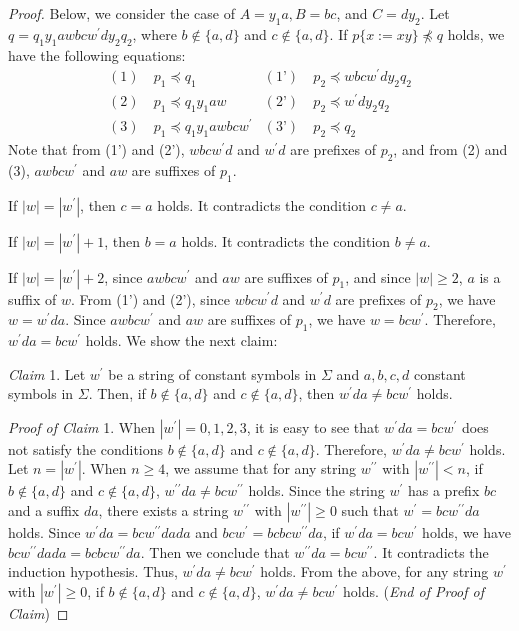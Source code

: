 \begin{proof}
  Below, we consider the case of $A=y_{1}a,B=bc$, and $C=dy_{2}$.
  Let $q=q_{1}y_{1}awbcw^{\prime}dy_{2}q_{2}$, where $b \not\in \{a,d\}$ and $c \not\in \{a,d\}$.
  If $p \{ x := xy \} \not \preceq q$ holds, we have the following equations:
  \begin{align*}
  (1)~& p_{1} \preceq q_{1} & (\text{1'})~& p_{2} \preceq wbcw^{\prime}dy_{2}q_{2} \\
  (2)~& p_{1} \preceq q_{1}y_{1}aw & (\text{2'})~& p_{2} \preceq w^{\prime}dy_{2}q_{2} \\
  (3)~& p_{1} \preceq q_{1}y_{1}awbcw^{\prime} & (\text{3'})~& p_{2} \preceq q_{2}
  \end{align*}
  Note that from (1') and (2'), $wbcw^{\prime}d$ and $w^{\prime}d$ are prefixes of $p_{2}$, and from (2) and (3), $awbcw^{\prime}$ and $aw$ are suffixes of $p_{1}$.

  If $|w|=|w^{\prime}|$, then $c=a$ holds.
  It contradicts the condition $c \not = a$.
  
  If $|w|=|w^{\prime}|+1$, then $b = a$ holds.
  It contradicts the condition $b \not = a$.
  
  If $|w| = |w^{\prime}|+2$, since $awbcw^{\prime}$ and $aw$ are suffixes of $p_{1}$, and since $|w|\geq 2$, $a$ is a suffix of $w$.
  From (1') and (2'), since $wbcw^{\prime}d$ and $w^{\prime}d$ are prefixes of $p_{2}$, we have $w=w^{\prime}da$.
  Since $awbcw^{\prime}$ and $aw$ are suffixes of $p_{1}$, we have $w=bcw^{\prime}$.
  Therefore, $w^{\prime}da = bcw^{\prime}$ holds. We show the next claim:

  \smallskip

  \noindent
  \textit{Claim} 1.
  Let $w^{\prime}$ be a string of constant symbols in $\Sigma$ and $a,b,c,d$ constant symbols in $\Sigma$.
  Then, if $b \not\in \{a,d\}$ and $c \not\in \{a,d\}$, then $w^{\prime}da \not = bcw^{\prime}$ holds.

  \smallskip
  
  \noindent
  \textit{Proof of Claim} 1.
  When $|w^{\prime}| = 0, 1, 2, 3$, it is easy to see that $w^{\prime}da=bcw^{\prime}$ does not satisfy the conditions $b \not\in \{a,d\}$ and $c \not\in \{a,d\}$. Therefore, $w^{\prime}da \not= bcw^{\prime}$ holds.
  Let $n = |w^{\prime}|$.
  When $n \ge 4$, we assume that for any string $w^{\prime\prime}$ with $|w^{\prime\prime}|<n$, if $b \not\in \{a,d\}$ and $c \not\in \{a,d\}$, $w^{\prime\prime}da \not =bcw^{\prime\prime}$ holds.
  Since the string $w^{\prime}$ has a prefix $bc$ and a suffix $da$, there exists a string $w^{\prime\prime}$ with $|w^{\prime\prime}| \geq 0$ such that $w^{\prime}=bcw^{\prime\prime}da$ holds.
  Since $w^{\prime}da=bcw^{\prime\prime}dada$ and $bcw^{\prime}=bcbcw^{\prime\prime}da$, if $w^{\prime}da = bcw^{\prime}$ holds, we have $bcw^{\prime\prime}dada=bcbcw^{\prime\prime}da$.
  Then we conclude that $w^{\prime\prime}da=bcw^{\prime\prime}$.
  It contradicts the induction hypothesis. Thus, $w^{\prime}da \not= bcw^{\prime}$ holds.
  From the above, for any string $w^{\prime}$ with $|w^{\prime}| \geq 0$, if $b \not\in \{a,d\}$ and $c \not\in \{a,d\}$, $w^{\prime}da \not =bcw^{\prime}$ holds.
  (\textit{End of Proof of Claim})
  

\end{proof}
